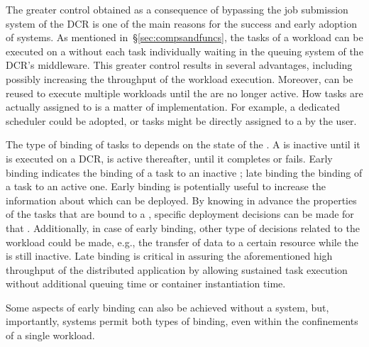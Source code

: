 \documentclass{sig-alternate}
\begin{document}

The greater control obtained as a consequence of bypassing the job submission
system of the DCR is one of the main reasons for the success and early adoption
of \pilot systems.  As mentioned in~\S\ref{sec:compsandfuncs}, the tasks of a
workload can be executed on a \pilot without each task individually waiting in
the queuing system of the DCR's middleware. This greater control results in
several advantages, including possibly increasing the throughput of the workload
execution. Moreover, \pilots can be reused to execute multiple workloads until
the \pilots are no longer active.  How tasks are actually assigned to \pilots is
a matter of implementation. For example, a dedicated scheduler could be adopted,
or tasks might be directly assigned to a \pilot by the user.

The type of binding of tasks to \pilots depends on the state of the \pilot. A
\pilot is inactive until it is executed on a DCR, is active thereafter, until it
completes or fails.  Early binding indicates the binding of a task to an
inactive \pilot; late binding the binding of a task to an active one. Early
binding is potentially useful to increase the information about which \pilots
can be deployed. By knowing in advance the properties of the tasks that are
bound to a \pilot, specific deployment decisions can be made for that \pilot.
Additionally, in case of early binding, other type of decisions related to the
workload could be made, e.g., the transfer of data to a certain resource while
the \pilot is still inactive. Late binding is critical in assuring the
aforementioned high throughput of the distributed application by allowing
sustained task execution without additional queuing time or container
instantiation time.

Some aspects of early binding can also be achieved without a \pilot system, but,
importantly, \pilot systems permit both types of binding, even within the
confinements of a single workload. 


\end{document}
